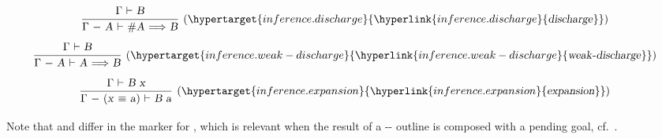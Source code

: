 \begin{isabellebody}
\begin{isamarkuptext}
  \[
  \infer[(\indexdef{}{inference}{discharge}\hypertarget{inference.discharge}{\hyperlink{inference.discharge}{\mbox{\isa{discharge}}}})]{\isa{{\isaliteral{22}{\isachardoublequote}}{\isaliteral{5C3C73747275743E}{\isasymstrut}}{\isaliteral{5C3C47616D6D613E}{\isasymGamma}}\ {\isaliteral{2D}{\isacharminus}}\ A\ {\isaliteral{5C3C7475726E7374696C653E}{\isasymturnstile}}\ {\isaliteral{23}{\isacharhash}}A\ {\isaliteral{5C3C4C6F6E6772696768746172726F773E}{\isasymLongrightarrow}}\ B{\isaliteral{22}{\isachardoublequote}}}}{\isa{{\isaliteral{22}{\isachardoublequote}}{\isaliteral{5C3C73747275743E}{\isasymstrut}}{\isaliteral{5C3C47616D6D613E}{\isasymGamma}}\ {\isaliteral{5C3C7475726E7374696C653E}{\isasymturnstile}}\ B{\isaliteral{22}{\isachardoublequote}}}}
  \]
  \[
  \infer[(\indexdef{}{inference}{weak-discharge}\hypertarget{inference.weak-discharge}{\hyperlink{inference.weak-discharge}{\mbox{\isa{weak{\isaliteral{5C3C68797068656E3E}{\isasymhyphen}}discharge}}}})]{\isa{{\isaliteral{22}{\isachardoublequote}}{\isaliteral{5C3C73747275743E}{\isasymstrut}}{\isaliteral{5C3C47616D6D613E}{\isasymGamma}}\ {\isaliteral{2D}{\isacharminus}}\ A\ {\isaliteral{5C3C7475726E7374696C653E}{\isasymturnstile}}\ A\ {\isaliteral{5C3C4C6F6E6772696768746172726F773E}{\isasymLongrightarrow}}\ B{\isaliteral{22}{\isachardoublequote}}}}{\isa{{\isaliteral{22}{\isachardoublequote}}{\isaliteral{5C3C73747275743E}{\isasymstrut}}{\isaliteral{5C3C47616D6D613E}{\isasymGamma}}\ {\isaliteral{5C3C7475726E7374696C653E}{\isasymturnstile}}\ B{\isaliteral{22}{\isachardoublequote}}}}
  \]
  \[
  \infer[(\indexdef{}{inference}{expansion}\hypertarget{inference.expansion}{\hyperlink{inference.expansion}{\mbox{\isa{expansion}}}})]{\isa{{\isaliteral{22}{\isachardoublequote}}{\isaliteral{5C3C73747275743E}{\isasymstrut}}{\isaliteral{5C3C47616D6D613E}{\isasymGamma}}\ {\isaliteral{2D}{\isacharminus}}\ {\isaliteral{28}{\isacharparenleft}}x\ {\isaliteral{5C3C65717569763E}{\isasymequiv}}\ a{\isaliteral{29}{\isacharparenright}}\ {\isaliteral{5C3C7475726E7374696C653E}{\isasymturnstile}}\ B\ a{\isaliteral{22}{\isachardoublequote}}}}{\isa{{\isaliteral{22}{\isachardoublequote}}{\isaliteral{5C3C73747275743E}{\isasymstrut}}{\isaliteral{5C3C47616D6D613E}{\isasymGamma}}\ {\isaliteral{5C3C7475726E7374696C653E}{\isasymturnstile}}\ B\ x{\isaliteral{22}{\isachardoublequote}}}}
  \]

  \medskip Note that \hyperlink{inference.discharge}{\mbox{}} and \hyperlink{inference.weak-discharge}{\mbox{}} differ in the marker for , which is
  relevant when the result of a \hyperlink{command.fix}{\mbox{}}-\hyperlink{command.assume}{\mbox{}}-\hyperlink{command.show}{\mbox{}} outline is composed with a pending goal,
  cf.\ .


\end{isamarkuptext}
\end{isabellebody}
